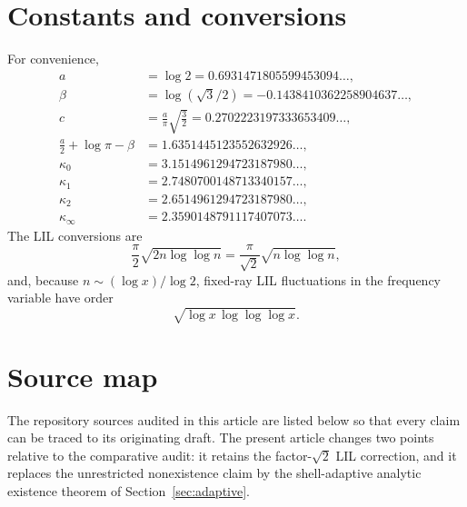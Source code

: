 \documentclass[11pt]{article}
\theoremstyle{definition}
\theoremstyle{remark}
\begin{document}
\appendix

\section{Constants and conversions}

For convenience,
\begin{align*}
 a&=\log2=0.6931471805599453094\ldots,\\
 \beta&=\log(\sqrt3/2)=-0.1438410362258904637\ldots,\\
 c&=\frac{a}{\pi}\sqrt{\frac32}
   =0.2702223197333653409\ldots,\\
 \frac a2+\log\pi-\beta
  &=1.6351445123552632926\ldots,\\
 \kappa_0&=3.1514961294723187980\ldots,\\
 \kappa_1&=2.7480700148713340157\ldots,\\
 \kappa_2&=2.6514961294723187980\ldots,\\
 \kappa_\infty&=2.3590148791117407073\ldots.
\end{align*}
The LIL conversions are
\[
 \frac\pi2\sqrt{2n\log\log n}
 =\frac\pi{\sqrt2}\sqrt{n\log\log n},
\]
and, because \(n\sim(\log x)/\log2\), fixed-ray LIL fluctuations in the
frequency variable have order
\[
 \sqrt{\log x\,\log\log\log x}.
\]

\section{Source map}

The repository sources audited in this article are listed below so that every
claim can be traced to its originating draft.  The present article changes two
points relative to the comparative audit: it retains the factor-\(\sqrt2\)
LIL correction, and it replaces the unrestricted nonexistence claim by the
shell-adaptive analytic existence theorem of Section~\ref{sec:adaptive}.
\end{document}
